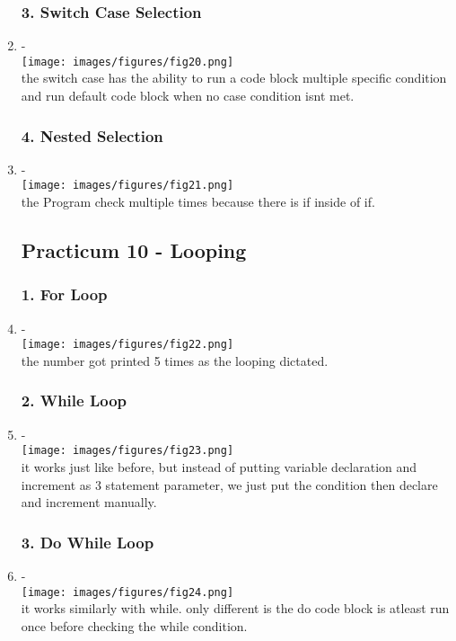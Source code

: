 \documentclass[12pt,titlepage]{article}
\begin{document}
\begin{enumerate}
    \subsubsection*{3. Switch Case Selection}
    \item - \\ \texttt{[image: images/figures/fig20.png]} \\ the switch case has the ability to run a code block multiple specific condition and run default code block when no case condition isnt met. 
    \subsubsection*{4. Nested Selection}
    \item - \\ \texttt{[image: images/figures/fig21.png]} \\ the Program check multiple times because there is if inside of if.
    \subsection*{Practicum 10 - Looping}
    \subsubsection*{1. For Loop}
    \item - \\ \texttt{[image: images/figures/fig22.png]} \\ the number got printed 5 times as the looping dictated.
    \subsubsection*{2. While Loop}
    \item - \\ \texttt{[image: images/figures/fig23.png]} \\ it works just like before, but instead of putting variable declaration and increment as 3 statement parameter, we just put the condition then declare and increment manually.  
    \subsubsection*{3. Do While Loop}
    \item - \\ \texttt{[image: images/figures/fig24.png]} \\ it works similarly with while. only different is the do code block is atleast run once before checking the while condition.
\end{enumerate}
\end{document}
